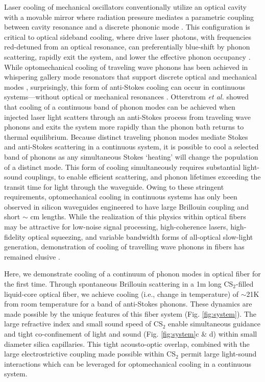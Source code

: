 Laser cooling of mechanical oscillators conventionally utilize an optical cavity with a movable mirror where radiation pressure mediates a parametric coupling between cavity resonance and a discrete phononic mode \citep{aspelmeyer2014cavity}. This configuration is critical to optical sideband cooling, where drive laser photons, with frequencies red-detuned from an optical resonance, can preferentially blue-shift by phonon scattering, rapidly exit the system, and lower the effective phonon occupancy \citep{aspelmeyer2014cavity}. While optomechanical cooling of traveling wave phonons has been achieved in whispering gallery mode resonators that support discrete optical and mechanical modes \citep{bahl2012observation}, surprisingly, this form of anti-Stokes cooling can occur in continuous systems---without optical or mechanical resonances \citep{otterstrom2018optomechanical}. Otterstrom {\it et al.} showed that cooling of a continuous band of phonon modes can be achieved when injected laser light scatters through an anti-Stokes process from traveling wave phonons and exits the system more rapidly than the phonon bath returns to thermal equilibrium.  Because distinct traveling phonon modes mediate Stokes and anti-Stokes scattering in a continuous system, it is possible to cool a selected band of phonons as any simultaneous Stokes `heating' will change the population of a distinct mode. This form of cooling simultaneously requires substantial light-sound couplings, to enable efficient scattering, and phonon lifetimes exceeding the transit time for light through the waveguide. Owing to these stringent requirements, optomechanical cooling in continuous systems has only been observed in silicon waveguides engineered to have large Brillouin coupling and short $\sim$ cm lengths. While the realization of this physics within optical fibers may be attractive for low-noise signal processing, high-coherence lasers, high-fidelity optical squeezing, and variable bandwidth forms of all-optical slow-light generation, demonstration of cooling of travelling wave phonons in fibers has remained elusive \citep{shin2015control,shelby1986generation,okawachi2005tunable}.

Here, we demonstrate cooling of a continuum of phonon modes in optical fiber for the first time. Through spontaneous Brillouin scattering in a 1m long CS$_2$-filled liquid-core optical fiber, we achieve cooling (i.e., change in temperature) of $\sim$21K from room temperature for a band of anti-Stokes phonons. These dynamics are made possible by the unique features of this fiber system (Fig. \ref{fig:system})\citep{kieu2013brillouin,kieu2014nonlinear,behunin2019spontaneous}. The large refractive index and small sound speed of CS$_2$ enable simultaneous guidance and tight co-confinement of light and sound (Fig. \ref{fig:system}c \& d) within small diameter silica capillaries. This tight acousto-optic overlap, combined with the large electrostrictive coupling made possible within CS$_2$ \citep{boyd2020nonlinear} permit large light-sound interactions which can be leveraged for optomechanical cooling in a continuous system.

